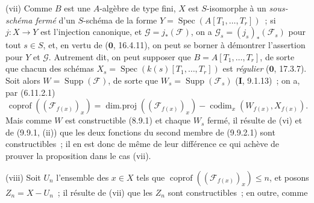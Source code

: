 (vii) Comme $B$ est une $A$-algèbre de type fini, $X$ est $S$-isomorphe à un
\emph{sous-schéma fermé} d'un $S$-schéma de la forme
$Y=\operatorname{Spec}(A[T_1,\ldots,T_r])$~; si $j:X\to Y$ est l'injection
canonique, et $\mathcal G=j_*(\mathcal F)$, on a
$\mathcal G_s=(j_s)_*(\mathcal F_s)$ pour tout $s\in S$, et, en vertu de
($\mathbf 0$, 16.4.11), on peut se borner à démontrer l'assertion pour $Y$ et
$\mathcal G$. Autrement dit, on peut supposer que $B=A[T_1,\ldots,T_r]$, de
sorte que chacun des schémas $X_s=\operatorname{Spec}(k(s)[T_1,\ldots,T_r])$
est \emph{régulier} ($\mathbf 0$, 17.3.7). Soit alors
$W=\operatorname{Supp}(\mathcal F)$, de sorte que
$W_s=\operatorname{Supp}(\mathcal F_s)$ (\textbf{I}, 9.1.13)~; on a, par
(6.11.2.1)
\begin{equation}
\tag{9.9.2.1}
\label{IV.9.9.2.1-fr}
\operatorname{coprof}((\mathcal F_{f(x)})_x)=
\operatorname{dim.proj}((\mathcal F_{f(x)})_x)-
\operatorname{codim}_x(W_{f(x)},X_{f(x)}).
\end{equation}
Mais comme $W$ est constructible (8.9.1) et chaque $W_s$ fermé, il résulte de
(vi) et de (9.9.1, (ii)) que les deux fonctions du second membre de (9.9.2.1)
sont constructibles~; il en est donc de même de leur différence ce qui achève
de prouver la proposition dans le cas (vii).

(viii) Soit $U_n$ l'ensemble des $x\in X$ tels que
$\operatorname{coprof}((\mathcal F_{f(x)})_x)\leq n$, et posons
$Z_n=X-U_n$~; il résulte de (vii) que les $Z_n$ sont constructibles~; en outre,
comme

